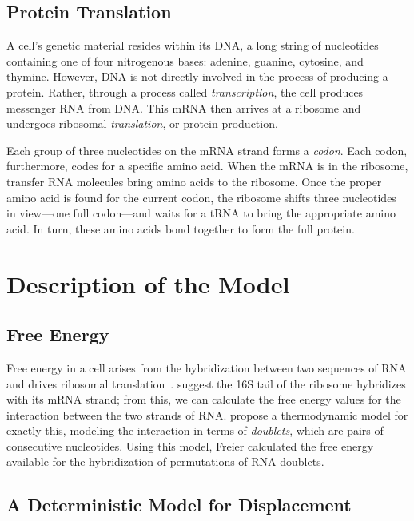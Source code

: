 \documentclass[12pt]{article}
\numberwithin{equation}{section}
\begin{document}
\subsection{Protein Translation}

A cell's genetic material resides within its DNA, a long string
of nucleotides containing one of four nitrogenous bases: adenine,
guanine, cytosine, and thymine.  However, DNA is not
directly involved in the process of producing a protein.  Rather, through
a process called \emph{transcription}, the cell produces messenger RNA from DNA.
This mRNA then arrives at a ribosome and undergoes ribosomal \emph{translation}, or
protein production.

Each group of three nucleotides on the mRNA strand forms a \emph{codon}.
Each codon, furthermore, codes for a specific amino acid.  When the mRNA
is in the ribosome, transfer RNA molecules bring amino acids
to the ribosome.  Once the proper amino acid is found for the current codon,
the ribosome shifts three nucleotides in view---one full codon---and waits
for a tRNA to bring the appropriate amino acid.  In turn, these amino acids
bond together to form the full protein.

\section{Description of the Model}
\label{allmodel}

\subsection{Free Energy}
\label{freeenergy}

Free energy in a cell arises from the hybridization between two
sequences of RNA and drives ribosomal translation~\cite{starmer}.
\citet{weiss88} suggest the 16S tail of the ribosome hybridizes with its mRNA strand;
from this, we can calculate the free energy values for the interaction between the two strands of RNA.
\citet{freier} propose a thermodynamic model for exactly this,
modeling the interaction in terms of \emph{doublets}, which are pairs of consecutive nucleotides.
Using this model, Freier calculated the free energy available
for the hybridization of permutations of RNA doublets.

\subsection{A Deterministic Model for Displacement} 
 
\end{document}
